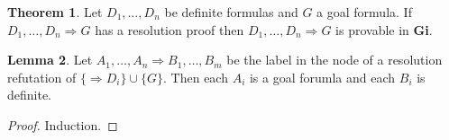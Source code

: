\documentclass[onehalfspacing]{article}
\theoremstyle{definition}
\newtheorem{theorem}{Theorem}[section]
\theoremstyle{definition}
\theoremstyle{definition}
\newtheorem{lemma}[theorem]{Lemma}
\theoremstyle{definition}
\theoremstyle{definition}
\theoremstyle{definition}
\newcommand{\Gi}{\textbf{Gi}\xspace}
\begin{document}
\begin{theorem}
	Let $D_1,\dots, D_n$ be definite formulas and $G$ a goal formula. If $D_1,\dots,D_n\Rightarrow G$ has a resolution proof then $D_1,\dots,D_n\Rightarrow G$ is provable in \Gi.
\end{theorem}

\begin{lemma}
	Let $A_1,\dots, A_n\Rightarrow B_1, \dots, B_m$ be the label in the node of a resolution refutation of $\{\Rightarrow D_i\}\cup\{G\}$. Then each $A_i$ is a goal forumla and each $B_i$ is definite.
\end{lemma}
\begin{proof}
	Induction.
\end{proof}
\pagebreak




\end{document}
